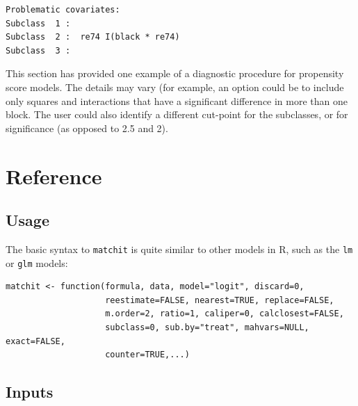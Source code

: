 \documentclass[oneside,letterpaper,titlepage]{article}
\begin{document}
\begin{verbatim}
Problematic covariates:
Subclass  1 :  
Subclass  2 :  re74 I(black * re74)
Subclass  3 :  
\end{verbatim}

This section has provided one example of a diagnostic procedure for propensity score models.  The details may vary (for 
example, an option could be to include only squares and interactions that have a significant difference in more than one 
block.  The user could also identify a different cut-point for the subclasses, or for significance (as opposed to 2.5
and 2).

\section{Reference}

\subsection{Usage}

The basic syntax to \texttt{matchit} is quite similar to other models in R, such as the
\texttt{lm} or \texttt{glm} models: 

\begin{verbatim}
matchit <- function(formula, data, model="logit", discard=0,
                    reestimate=FALSE, nearest=TRUE, replace=FALSE,
                    m.order=2, ratio=1, caliper=0, calclosest=FALSE,
                    subclass=0, sub.by="treat", mahvars=NULL, exact=FALSE,
                    counter=TRUE,...)
\end{verbatim}

\subsection{Inputs}
\end{document}
